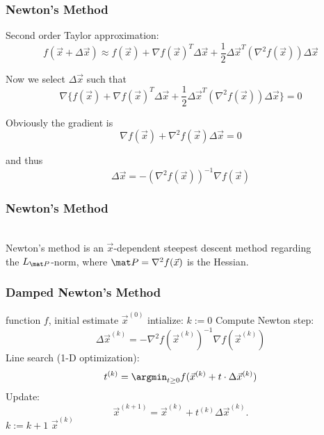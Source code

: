 \begin{frame}
  \frametitle{Newton's Method \cont}
 
  Second order Taylor approximation:
  \begin{displaymath}
    f(\vec x+\Delta \vec x) 
    \approx f(\vec x) + \nabla f(\vec x)^T \Delta \vec x + \frac{1}{2} \Delta \vec x^T (\nabla^2 f(\vec x))\Delta \vec x 
  \end{displaymath}
  \pause

  Now we select $\Delta \vec x$ such that 
  \begin{displaymath}
    \nabla\{  f(\vec x) + \nabla f(\vec x)^T \Delta \vec x + \frac{1}{2}\Delta \vec x^T (\nabla^2 f(\vec x))\Delta \vec x\} 
    = 0
  \end{displaymath}
  \pause

  Obviously the gradient is
  \begin{displaymath}
    \nabla f(\vec x)+ \nabla^2 f(\vec x)\Delta \vec x 
    = 0
  \end{displaymath}
  \pause

  and thus
  \begin{displaymath}
    \Delta \vec x 
    = -(\nabla^2 f(\vec x))^{-1} \nabla f(\vec x)
  \end{displaymath} 
\end{frame}


\begin{frame}
  \frametitle{Newton's Method \cont}

   \\[.25cm]
 
  Newton's method is an $\vec x$-dependent steepest descent method regarding \\
  the $L_{\mat P}$-norm, where $\mat P = \nabla^2 f(\vec x)$ is the Hessian.
\end{frame}


\begin{frame}
  \frametitle{Damped Newton's Method}
  
  \begin{algorithmic}
    \STATE {} function $f$, initial estimate $\vec x^{(0)}$
    \STATE intialize: $k:=0$
    \REPEAT
      \STATE Compute Newton step:     $$ \Delta \vec x^{(k)}= -\nabla^2 f(\vec x^{(k)})^{-1} \nabla f(\vec x^{(k)}) $$
      \STATE Line search (1-D optimization): $$t^{(k)}= \argmin_{t \geq 0}f(\vec x^{(k)}+t\cdot \Delta\vec x^{(k)})$$
      \STATE Update:
        \begin{displaymath}
          \vec x^{(k+1)} = \vec x^{(k)} + t^{(k)}\Delta \vec x^{(k)} .
        \end{displaymath}
    \STATE $k:=k+1$
   \STATE {} $\vec x^{(k)}$
 \end{algorithmic}
\end{frame}


